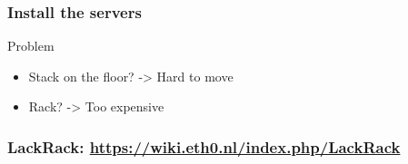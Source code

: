 \documentclass[aspectratio=169,11pt,hyperref={colorlinks=true}]{beamer}
\begin{document}
\begin{frame}
  \frametitle{Install the servers}
  Problem
  \begin{itemize}
    \item Stack on the floor? -> Hard to move
    \item Rack? -> Too expensive
  \end{itemize}
\end{frame}

\begin{frame}
  \frametitle{LackRack: \url{https://wiki.eth0.nl/index.php/LackRack}}
\end{frame}
\end{document}

